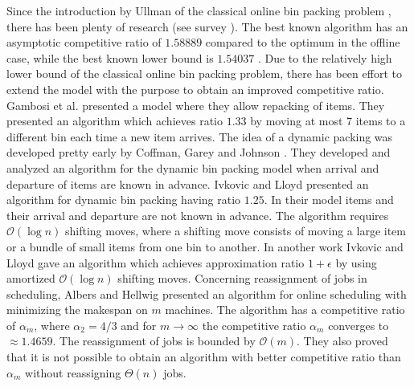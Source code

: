 \documentclass[a4paper,11pt]{article}
\begin{document}
Since the introduction by Ullman of the classical online bin packing problem \cite{ullman1971}, there has been 
plenty of research 
(see survey \cite {csirik1998}). The best known algorithm has an asymptotic competitive
ratio of $1.58889$ \cite{seiden2002} compared to the optimum in the offline case, 
while the best known lower bound is $1.54037$ \cite{balogh2010}.
Due to the relatively high lower bound of the classical online bin packing problem, there has been effort
to extend the model with the purpose to obtain an improved competitive ratio.
Gambosi et al. \cite{gambosi2000} presented a model where they allow repacking of items. 
They presented an algorithm 
which achieves ratio $1.33$ by moving at most 7 items to a different bin each time
a new item arrives.
The idea of a dynamic packing was developed pretty early by Coffman, Garey and Johnson \cite{coffman1983}.
They developed and analyzed an algorithm for the dynamic bin packing model when arrival and departure of items
are known in advance.
Ivkovic and Lloyd \cite{ivkovic1998} presented an algorithm for dynamic bin packing having ratio $1.25$.
In their model items and their arrival and departure are not known in advance.
The algorithm requires $\mathcal{O}(\log n)$ shifting moves, where a shifting move consists of moving a 
large item or a bundle of small items from one bin to another. 
In another work Ivkovic and Lloyd \cite{ivkovic1997} gave an algorithm which achieves approximation
ratio $1+ \epsilon$ by using amortized $\mathcal{O}(\log n)$ shifting moves.
Concerning reassignment of jobs in scheduling, Albers and Hellwig \cite{albers2012} 
presented an algorithm for online scheduling with minimizing the makespan on $m$ machines. 
The algorithm has a competitive ratio
of $\alpha_m$, where $\alpha_2 = 4/3$ and for $m \rightarrow \infty$ the competitive ratio $\alpha_m$ converges 
to $\approx 1.4659$. The reassignment of jobs is bounded by $\mathcal{O}(m)$. 
They also proved that it is not possible to obtain an algorithm with better competitive ratio than $\alpha_m$
without reassigning $\Theta (n)$ jobs.
\end{document}

